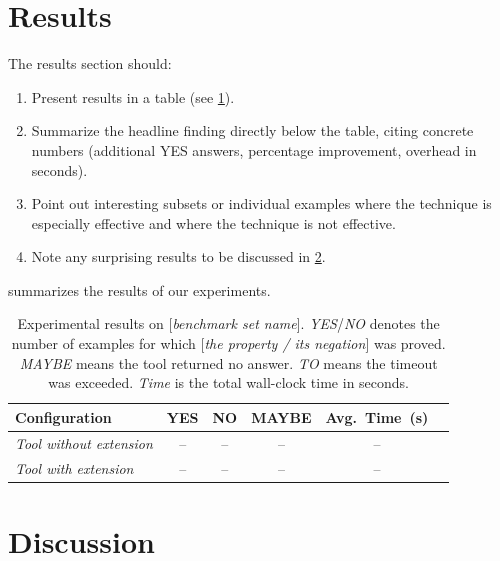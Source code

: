 \section{Results}\label{sec:results}

The results section should:
\begin{enumerate}
    \item Present results in a table (see \cref{tab:results}).
    \item Summarize the headline finding directly below the table, citing concrete
          numbers (additional YES answers, percentage improvement, overhead in seconds).
    \item Point out interesting subsets or individual examples where the technique
          is especially effective and where the technique is not effective.
    \item Note any surprising results to be discussed in \cref{sec:discussion}.
\end{enumerate}

 summarizes the results of our experiments.

\begin{table}[H]
    \centering
    \caption{Experimental results on [\textit{benchmark set name}].
             \emph{YES}/\emph{NO} denotes the number of examples for which
             [\textit{the property / its negation}] was proved.
             \emph{MAYBE} means the tool returned no answer.
             \emph{TO} means the timeout was exceeded.
             \emph{Time} is the total wall-clock time in seconds.}
    \label{tab:results}
    \begin{tabular}{lccccc}
        \toprule
        \textbf{Configuration} &
        \textbf{YES} & \textbf{NO} & \textbf{MAYBE}& \textbf{Avg.~Time~(s)} \\
        \midrule
        \textit{Tool without extension} & -- & -- & -- & -- \\
        \textit{Tool with extension}    & -- & -- & -- & -- \\
        \bottomrule
    \end{tabular}
\end{table}

\section{Discussion}\label{sec:discussion}

